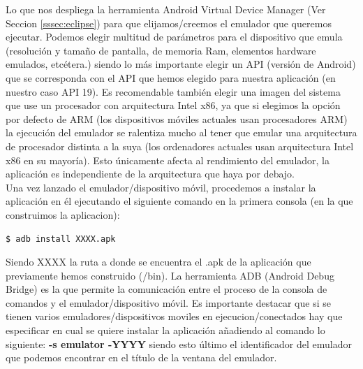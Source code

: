  	 Lo que nos despliega la herramienta Android Virtual Device Manager (Ver Seccion \ref{sssec:eclipse}) para que elijamos/creemos el emulador que queremos ejecutar. Podemos elegir multitud de parámetros \cite{ref_android_avd_params} para el dispositivo que emula (resolución y tamaño de pantalla, de memoria Ram, elementos hardware emulados, etcétera.) siendo lo más importante elegir un API (versión de Android) que se corresponda con el API que hemos elegido para nuestra aplicación (en nuestro caso API 19). Es recomendable también elegir una imagen del sistema que use un procesador con arquitectura Intel x86, ya que si elegimos la opción por defecto de ARM (los dispositivos móviles actuales usan procesadores ARM) la ejecución del emulador se ralentiza mucho al tener que emular una arquitectura de procesador distinta a la suya (los ordenadores actuales usan arquitectura Intel x86 en su mayoría). Esto únicamente afecta al rendimiento del emulador, la aplicación es independiente de la arquitectura que haya por debajo. \\[.2cm]
 
     Una vez lanzado el emulador/dispositivo móvil, procedemos a instalar la aplicación en él ejecutando el siguiente comando en la primera consola (en la que construimos la aplicacion):
		      	 
 	 \begin{lstlisting}[style=console, numbers=none]
		$ adb install XXXX.apk
	 \end{lstlisting}		
 	 
 	 Siendo XXXX la ruta a donde se encuentra el .apk de la aplicación que previamente hemos construido (/bin). La herramienta ADB (Android Debug Bridge) \cite{ref:android_adb} es la que permite la comunicación entre el proceso de la consola de comandos y el emulador/dispositivo móvil. Es importante destacar que si se tienen varios emuladores/dispositivos moviles en ejecucion/conectados hay que especificar en cual se quiere instalar la aplicación añadiendo al comando lo siguiente: \textbf{-s emulator -YYYY} siendo esto último el identificador del emulador que podemos encontrar en el título de la ventana del emulador. \\[.2cm]
	     
